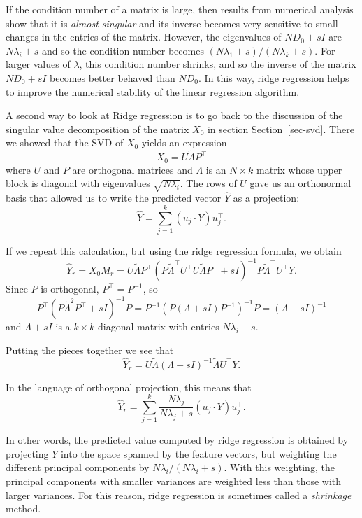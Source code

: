 \documentclass[
  11pt,
  letterpaper,
]{scrbook}
\theoremstyle{plain}
\theoremstyle{remark}
\begin{document}
If the condition number of a matrix is large, then results from
numerical analysis show that it is \emph{almost singular} and its
inverse becomes very sensitive to small changes in the entries of the
matrix. However, the eigenvalues of \(ND_0+sI\) are \(N\lambda_{i}+s\)
and so the condition number becomes \((N\lambda_1+s)/(N\lambda_k+s)\).
For larger values of \(\lambda\), this condition number shrinks, and so
the inverse of the matrix \(ND_0+sI\) becomes better behaved than
\(ND_{0}\). In this way, ridge regression helps to improve the numerical
stability of the linear regression algorithm.

A second way to look at Ridge regression is to go back to the discussion
of the singular value decomposition of the matrix \(X_{0}\) in section
Section~\ref{sec-svd}. There we showed that the SVD of \(X_{0}\) yields
an expression \[
X_{0}=U\tilde{\Lambda}P^{\intercal}
\] where \(U\) and \(P\) are orthogonal matrices and \(\Lambda\) is an
\(N\times k\) matrix whose upper block is diagonal with eigenvalues
\(\sqrt{N\lambda_{i}}\). The rows of \(U\) gave us an orthonormal basis
that allowed us to write the predicted vector \(\hat{Y}\) as a
projection: \[
\hat{Y}=\sum_{j=1}^{k} (u_j\cdot Y)u_{j}^{\intercal}.
\]

If we repeat this calculation, but using the ridge regression formula,
we obtain \[
\hat{Y}_{r}=X_{0}M_r = U\tilde{\Lambda}P^{\intercal}(P\tilde{\Lambda}^{\intercal}U^{\intercal}U\tilde{\Lambda}P^{\intercal}+sI)^{-1}P\tilde{\Lambda}^{\intercal}U^{\intercal}Y.
\] Since \(P\) is orthogonal, \(P^{\intercal}=P^{-1}\), so \[
P^{\intercal}(P\tilde{\Lambda}^2P^{\intercal}+sI)^{-1}P=P^{-1}(P(\Lambda+sI)P^{-1})^{-1}P=(\Lambda+sI)^{-1}
\] and \(\Lambda+sI\) is a \(k\times k\) diagonal matrix with entries
\(N\lambda_{i}+s\).

Putting the pieces together we see that \[
\hat{Y}_{r}=U\tilde{\Lambda}(\Lambda+sI)^{-1}\tilde{\Lambda}U^{\intercal}Y.
\]

In the language of orthogonal projection, this means that \[
\hat{Y}_{r} = \sum_{j=1}^{k} \frac{N\lambda_{j}}{N\lambda_{j}+s}(u_j\cdot Y)u_{j}^{\intercal}.
\]

In other words, the predicted value computed by ridge regression is
obtained by projecting \(Y\) into the space spanned by the feature
vectors, but weighting the different principal components by
\(N\lambda_{i}/(N\lambda_{i}+s)\). With this weighting, the principal
components with smaller variances are weighted less than those with
larger variances. For this reason, ridge regression is sometimes called
a \emph{shrinkage} method.
\end{document}
